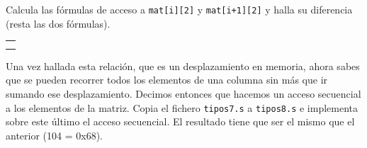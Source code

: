 Calcula las fórmulas de acceso a  {\tt mat[i][2]} y  {\tt mat[i+1][2]} y
halla su diferencia (resta las dos fórmulas).

\vspace{0.25cm}
\colorbox[gray]{0.9}{
\small
\begin{tabular}{c}
\\
\begin{minipage}{0.9\linewidth}
\colorbox[gray]{1}{\rule{0cm}{0.6cm}\rule{11cm}{0cm}}\\
\end{minipage} \\
\end{tabular}
\vspace{0.5ex}
}

\vspace{0.25cm} 

Una vez hallada esta relación, que es un desplazamiento en memoria,
ahora sabes que se pueden recorrer todos los elementos de una columna
sin más que ir sumando ese desplazamiento. Decimos entonces que
hacemos un acceso secuencial a los elementos de la matriz. Copia el
fichero {\tt tipos7.s} a {\tt tipos8.s} e implementa sobre este
último  el acceso secuencial. El resultado tiene que ser el mismo
que el anterior (104 = 0x68).

\chapterend{}
